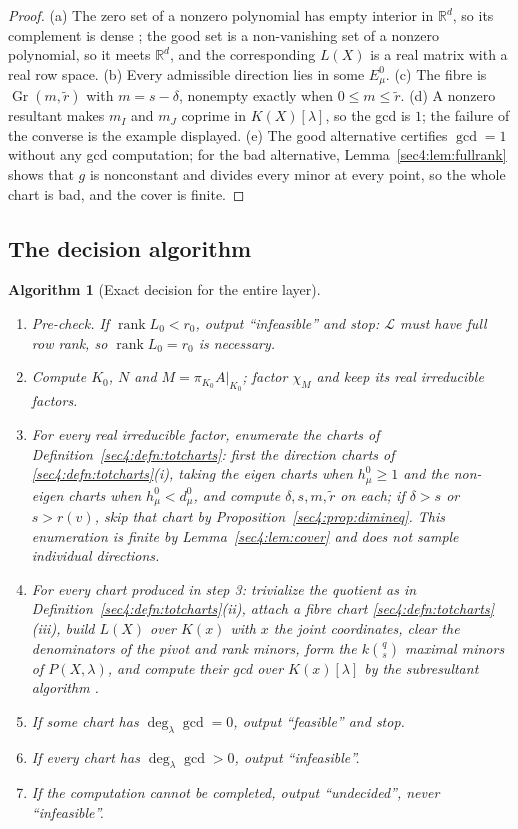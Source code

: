 \documentclass[journal]{IEEEtran}
\theoremstyle{plainn}
\newtheorem{algo}[thm]{Algorithm}
\theoremstyle{remark}
\newcommand{\rank}{\operatorname{rank}}
\newcommand{\Gr}{\operatorname{Gr}}
\begin{document}
\begin{proof}
(a) The zero set of a nonzero polynomial has empty interior in $\mathbb R^d$, so its complement is
dense \cite{bpr06}; the good set is a non-vanishing set of a nonzero polynomial, so it meets
$\mathbb R^d$, and the corresponding $L(X)$ is a real matrix with a real row space.
(b) Every admissible direction lies in some $E_\mu^0$.
(c) The fibre is $\Gr(m,\widetilde r)$ with $m=s-\delta$, nonempty exactly when
$0\le m\le\widetilde r$.
(d) A nonzero resultant makes $m_I$ and $m_J$ coprime in $K(X)[\lambda]$, so the gcd is $1$; the
failure of the converse is the example displayed.
(e) The good alternative certifies $\gcd=1$ without any gcd computation; for the bad alternative,
Lemma~\ref{sec4:lem:fullrank} shows that $g$ is nonconstant and divides every minor at every point, so
the whole chart is bad, and the cover is finite.
\end{proof}

\subsection{The decision algorithm}
\label{sec4:algorithm}

\begin{algo}[Exact decision for the entire layer]
\label{sec4:algo:decide}
\begin{enumerate}
\item \emph{Pre-check.} If $\rank L_0<r_0$, output ``infeasible'' and stop: $\mathcal L$ must have
full row rank, so $\rank L_0=r_0$ is necessary.
\item Compute $K_0$, $N$ and $M=\pi_{K_0}A|_{K_0}$; factor $\chi_M$ and keep its real irreducible
factors.
\item For every real irreducible factor, enumerate the charts of Definition~\ref{sec4:defn:totcharts}:
first the direction charts of \ref{sec4:defn:totcharts}(i), taking the eigen charts when
$h_\mu^0\ge1$ and the non-eigen charts when $h_\mu^0<d_\mu^0$, and compute $\delta,s,m,\widetilde r$ on
each; if $\delta>s$ or $s>r(v)$, skip that chart by Proposition~\ref{sec4:prop:dimineq}. This
enumeration is finite by Lemma~\ref{sec4:lem:cover} and does \emph{not} sample individual directions.
\item For every chart produced in step 3: trivialize the quotient as in
Definition~\ref{sec4:defn:totcharts}(ii), attach a fibre chart \ref{sec4:defn:totcharts}(iii), build
$L(X)$ over $K(x)$ with $x$ the joint coordinates, clear the denominators of the pivot and rank minors,
form the $k\binom{q}{s}$ maximal minors of $P(X,\lambda)$, and compute their gcd over $K(x)[\lambda]$
by the subresultant algorithm \cite{vzgg03}.
\item If some chart has $\deg_\lambda\gcd=0$, output ``feasible'' and stop.
\item If every chart has $\deg_\lambda\gcd>0$, output ``infeasible''.
\item If the computation cannot be completed, output ``undecided'', never ``infeasible''.
\end{enumerate}
\end{algo}
\end{document}
